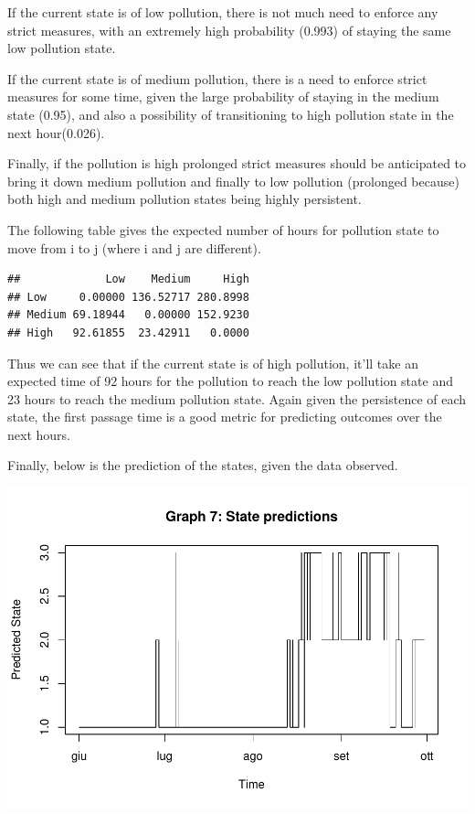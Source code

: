 \documentclass[
]{article}
\begin{document}
If the current state is of low pollution, there is not much need to
enforce any strict measures, with an extremely high probability (0.993)
of staying the same low pollution state.

If the current state is of medium pollution, there is a need to enforce
strict measures for some time, given the large probability of staying in
the medium state (0.95), and also a possibility of transitioning to high
pollution state in the next hour(0.026).

Finally, if the pollution is high prolonged strict measures should be
anticipated to bring it down medium pollution and finally to low
pollution (prolonged because) both high and medium pollution states
being highly persistent.

The following table gives the expected number of hours for pollution
state to move from i to j (where i and j are different).

\begin{verbatim}
##             Low    Medium     High
## Low     0.00000 136.52717 280.8998
## Medium 69.18944   0.00000 152.9230
## High   92.61855  23.42911   0.0000
\end{verbatim}

Thus we can see that if the current state is of high pollution, it'll
take an expected time of 92 hours for the pollution to reach the low
pollution state and 23 hours to reach the medium pollution state. Again
given the persistence of each state, the first passage time is a good
metric for predicting outcomes over the next hours.

Finally, below is the prediction of the states, given the data observed.

\begin{center}\includegraphics[width=1\linewidth,height=0.75\textheight]{finalproject_files/figure-latex/unnamed-chunk-2-1} \end{center}
\end{document}

